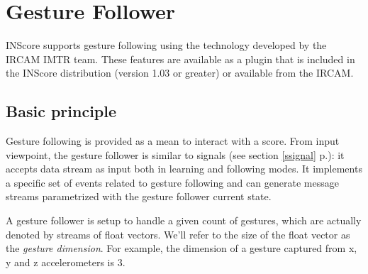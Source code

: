\documentclass[a4paper,twoside]{report}
\newcommand{\toplevel}[1]	{\chapter{#1}}
\newcommand{\sublevel}[1]	{\section{#1}}
\newcommand{\fullref}[1]	{\ref{#1} p.\pageref{#1}}
\newcommand{\OSC}[1]		{\texttt{#1}}
\begin{document}
%
%
%


\toplevel{Gesture Follower}
\label{GF}

INScore supports gesture following using the technology developed by the IRCAM IMTR team. These features are available as a plugin that is included in the INScore distribution (version 1.03 or greater) or available from the IRCAM.

\sublevel{Basic principle}\label{gfbasic}
Gesture following is provided as a mean to interact with a score. From input viewpoint, the gesture follower is similar to signals (see section \fullref{ssignal}): it accepts data stream as input both in learning and following modes. It implements a specific set of events related to gesture following and can generate message streams parametrized with the gesture follower current state.

A gesture follower is setup to handle a given count of gestures, which are actually denoted by streams of float vectors. We'll refer to the size of the float vector as the \emph{gesture dimension}. For example, the dimension of a gesture captured from x, y and z accelerometers is 3.
\end{document}
